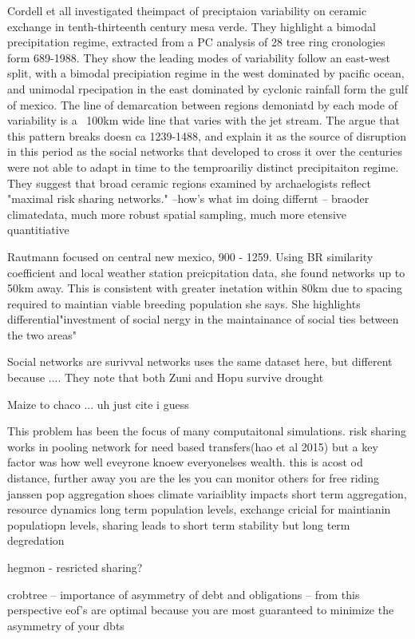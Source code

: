 \documentclass[fleqn,10pt]{wlscirep}
\begin{document}
Cordell et all investigated theimpact of preciptaion variability on ceramic exchange in tenth-thirteenth century mesa verde. They highlight a bimodal precipitation regime, extracted from a PC analysis of 28 tree ring cronologies form 689-1988. They show the leading modes of variability follow an east-west split, with a bimodal precipiation regime in the west dominated by pacific ocean, and unimodal rpecipation in the east dominated by cyclonic rainfall form the gulf of mexico. The line of demarcation between regions demoniatd by each mode of variability is a ~100km wide line that varies with the jet stream. The argue that this pattern breaks doesn ca 1239-1488, and explain it as the source of disruption in this period as the social networks that developed to cross it over the centuries were not able to adapt in time to the temproariliy distinct precipitaiton regime. They suggest that broad ceramic regions examined by archaelogists reflect "maximal risk sharing networks."
--how's what im doing differnt -- braoder climatedata, much more robust spatial sampling, much more etensive quantitiative

Rautmann focused on central new mexico, 900 - 1259. Using BR similarity coefficient and local weather station preicpitation data, she found networks up to 50km away. This is consistent with greater inetation within 80km due to spacing required to maintian viable breeding population she says. She highlights differential"investment of social nergy in the maintainance of social ties between the two areas"

Social networks are surivval networks uses the same dataset here, but different because ....
They note that both Zuni and Hopu survive drought

Maize to chaco ... uh just cite i guess


This problem has been the focus of many computaitonal simulations. risk sharing works in pooling network for need based transfers(hao et al 2015) but a key factor was how well eveyrone knoew everyonelses wealth. this is acost od distance, further away you are the les you can monitor others for free riding
janssen pop aggregation shoes climate variaiblity impacts short term aggregation, resource dynamics long term population levels, exchange cricial for maintianin populatiopn levels, sharing leads to short term stability but long term degredation

hegmon - resricted sharing?

crobtree -- importance of asymmetry of debt and obligations -- from this perspective eof's are optimal because you are most guaranteed to minimize the asymmetry of your dbts
\end{document}
